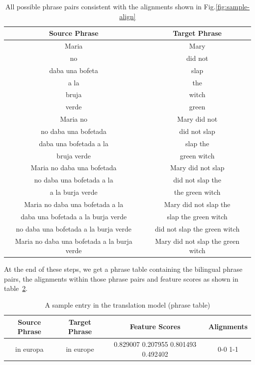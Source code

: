 \begin{table}
	\begin{center}
		\begin{tabular}{|c|c|}
			\hline
			\textbf{Source Phrase} & \textbf{Target Phrase} \\\hline
			Maria & Mary\\
			no & did not \\
			daba una bofeta & slap \\
			a la & the \\
			bruja & witch \\
			verde & green \\
			Maria no & Mary did not \\
			no daba una bofetada & did not slap \\
			daba una bofetada a la & slap the \\
			bruja verde & green witch \\
			Maria no daba una bofetada & Mary did not slap \\
			no daba una bofetada a la & did not slap the \\
			a la burja verde & the green witch \\
			Maria no daba una bofetada a la & Mary did not slap the \\
			daba una bofetada a la burja verde & slap the green witch \\
			no daba una bofetada a la burja verde & did not slap the green witch \\
			Maria no daba una bofetada a la burja verde & Mary did not slap the green witch \\ \hline
		\end{tabular}
		\caption{All possible phrase pairs consistent with the alignments shown in Fig.\ref{fig:sample-align}}
		\label{table:sample-phrase-pairs}		
	\end{center}
\end{table}

At the end of these steps, we get a phrase table containing the bilingual phrase pairs, the alignments within those phrase pairs and feature scores as shown in table~\ref{table:sample-phrase-table-entry}.

\begin{table}
	\begin{center}
		\begin{tabular}{|c|c|c|c|}
			\hline
			\textbf{Source Phrase} & \textbf{Target Phrase} & \textbf{Feature Scores} & \textbf{Alignments}\\\hline
			in europa & in europe & 0.829007 0.207955 0.801493 0.492402 & 0-0 1-1 \\\hline
		\end{tabular}
		\caption{A sample entry in the translation model (phrase table)}
		\label{table:sample-phrase-table-entry}		
	\end{center}
\end{table}


